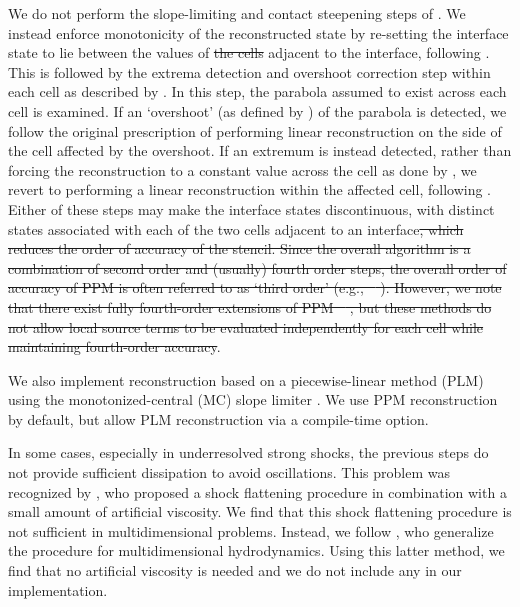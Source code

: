 \documentclass[fleqn,usenatbib]{mnras}
\providecommand{\DIFadd}[1]{{\protect\color{blue}\uwave{#1}}} %
\providecommand{\DIFdel}[1]{{\protect\color{red}\sout{#1}}}                      %
\providecommand{\DIFaddbegin}{} %
\providecommand{\DIFaddend}{} %
\providecommand{\DIFdelbegin}{} %
\providecommand{\DIFdelend}{} %
\newcommand{\DIFscaledelfig}{0.5}
\newlength{\DIFdelgraphicswidth} %
\newlength{\DIFdelgraphicsheight} %
\newcommand{\DIFaddincludegraphics}[2][]{{\color{blue}\fbox{\DIFOincludegraphics[#1]{#2}}}} %
\newcommand{\DIFdelincludegraphics}[2][]{%
\sbox{\DIFdelgraphicsbox}{\DIFOincludegraphics[#1]{#2}}%
\settoboxwidth{\DIFdelgraphicswidth}{\DIFdelgraphicsbox} %
\settoboxtotalheight{\DIFdelgraphicsheight}{\DIFdelgraphicsbox} %
\scalebox{\DIFscaledelfig}{%
\parbox[b]{\DIFdelgraphicswidth}{\usebox{\DIFdelgraphicsbox}\\[-\baselineskip] \rule{\DIFdelgraphicswidth}{0em}}\llap{\resizebox{\DIFdelgraphicswidth}{\DIFdelgraphicsheight}{%
\setlength{\unitlength}{\DIFdelgraphicswidth}%
\begin{picture}(1,1)%
\thicklines\linethickness{2pt} %
{\color[rgb]{1,0,0}\put(0,0){\framebox(1,1){}}}%
{\color[rgb]{1,0,0}\put(0,0){\line( 1,1){1}}}%
{\color[rgb]{1,0,0}\put(0,1){\line(1,-1){1}}}%
\end{picture}%
}\hspace*{3pt}}} %
} %
\DeclareRobustCommand{\DIFaddbegin}{\DIFOaddbegin \let\includegraphics\DIFaddincludegraphics} %
\DeclareRobustCommand{\DIFaddend}{\DIFOaddend \let\includegraphics\DIFOincludegraphics} %
\DeclareRobustCommand{\DIFdelbegin}{\DIFOdelbegin \let\includegraphics\DIFdelincludegraphics} %
\DeclareRobustCommand{\DIFdelend}{\DIFOaddend \let\includegraphics\DIFOincludegraphics} %
\begin{document}
We do not perform the slope-limiting and contact steepening steps of . We instead enforce monotonicity of the reconstructed state by re-setting the interface state to lie between the values of \DIFdelbegin \DIFdel{the cells }\DIFdelend \DIFaddbegin \DIFadd{all cells (including those in transverse directions) }\DIFaddend adjacent to the interface, following \cite{Mignone_2005}. This is followed by the extrema detection and overshoot correction step within each cell as described by . In this step, the parabola assumed to exist across each cell is examined. If an `overshoot' (as defined by ) of the parabola is detected, we follow the original  prescription of performing linear reconstruction on the side of the cell affected by the overshoot. If an extremum is instead detected, rather than forcing the reconstruction to a constant value across the cell as done by , we revert to performing a linear reconstruction within the affected cell, following \cite{Balsara_2017}. Either of these steps may make the interface states discontinuous, with distinct states associated with each of the two cells adjacent to an interface\DIFdelbegin \DIFdel{, which reduces the order of accuracy of the stencil. Since the overall algorithm is a combination of second order and (usually) fourth order steps, the overall order of accuracy of PPM is often referred to as `third order' (e.g., \mbox{%
\citealt{Stone_2020}}\hspace{0pt}%
). However, we note that there exist fully fourth-order extensions of PPM \mbox{%
\citep{Felker_2018}}\hspace{0pt}%
, but these methods do not allow local source terms to be evaluated independently for each cell while maintaining fourth-order accuracy}\DIFdelend .

We also implement reconstruction based on a piecewise-linear method (PLM) using the monotonized-central (MC) slope limiter \citep{VanLeer_1977}. We use PPM reconstruction by default, but allow PLM reconstruction via a compile-time option.

In some cases, especially in underresolved strong shocks, the previous steps do not provide sufficient dissipation to avoid oscillations. This problem was recognized by , who proposed a shock flattening procedure in combination with a small amount of artificial viscosity. We find that this shock flattening procedure is not sufficient in multidimensional problems. Instead, we follow \cite{Miller_2002}, who generalize the  procedure for multidimensional hydrodynamics. Using this latter method, we find that no artificial viscosity is needed and we do not include any in our implementation.
\end{document}
